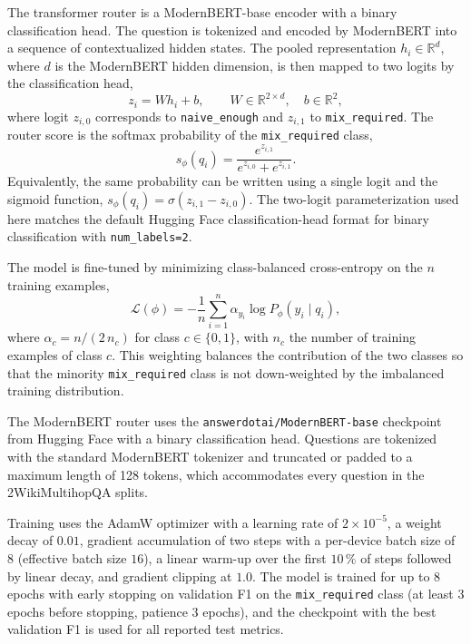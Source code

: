 \documentclass[english, bibtex]{kththesis}               %
\numberwithin{listing}{chapter}
\begin{document}
The transformer router is a ModernBERT-base \cite{warner2024modernbert} encoder with a binary classification head. The question is tokenized and encoded by ModernBERT into a sequence of contextualized hidden states. The pooled representation \(h_i \in \mathbb{R}^{d}\), where \(d\) is the ModernBERT hidden dimension, is then mapped to two logits by the classification head,
\begin{equation}
\label{eq:modernBertLogits}
z_i = W h_i + b,
\qquad
W \in \mathbb{R}^{2 \times d}, \quad b \in \mathbb{R}^{2},
\end{equation}
where logit \(z_{i,0}\) corresponds to \texttt{naive\_enough} and \(z_{i,1}\) to \texttt{mix\_required}. The router score is the softmax probability of the \texttt{mix\_required} class,
\begin{equation}
\label{eq:modernBertSoftmax}
s_\phi(q_i)
=
\frac{e^{z_{i,1}}}{e^{z_{i,0}} + e^{z_{i,1}}}.
\end{equation}
Equivalently, the same probability can be written using a single logit and the sigmoid function, $s_\phi(q_i) = \sigma(z_{i,1} - z_{i,0})$. The two-logit parameterization used here matches the default Hugging Face classification-head format for binary classification with \texttt{num\_labels=2}.

The model is fine-tuned by minimizing class-balanced cross-entropy on the \(n\) training examples,
\begin{equation}
\label{eq:modernBertLoss}
\mathcal{L}(\phi)
=
-\frac{1}{n}\sum_{i=1}^{n}
\alpha_{y_i} \log P_\phi(y_i \mid q_i),
\end{equation}
where \(\alpha_{c} = n / (2\,n_c)\) for class \(c \in \{0, 1\}\), with \(n_c\) the number of training examples of class \(c\). This weighting balances the contribution of the two classes so that the minority \texttt{mix\_required} class is not down-weighted by the imbalanced training distribution.

The ModernBERT router uses the \texttt{answerdotai/ModernBERT-base} checkpoint from Hugging Face \cite{warner2024modernbert} with a binary classification head. Questions are tokenized with the standard ModernBERT tokenizer and truncated or padded to a maximum length of 128 tokens, which accommodates every question in the 2WikiMultihopQA splits.

Training uses the AdamW optimizer \cite{loshchilov2019decoupled} with a learning rate of $2 \times 10^{-5}$, a weight decay of $0.01$, gradient accumulation of two steps with a per-device batch size of $8$ (effective batch size $16$), a linear warm-up over the first $10\,\%$ of steps followed by linear decay, and gradient clipping at $1.0$. The model is trained for up to $8$ epochs with early stopping on validation F1 on the \texttt{mix\_required} class (at least $3$ epochs before stopping, patience $3$ epochs), and the checkpoint with the best validation F1 is used for all reported test metrics.
\end{document}
